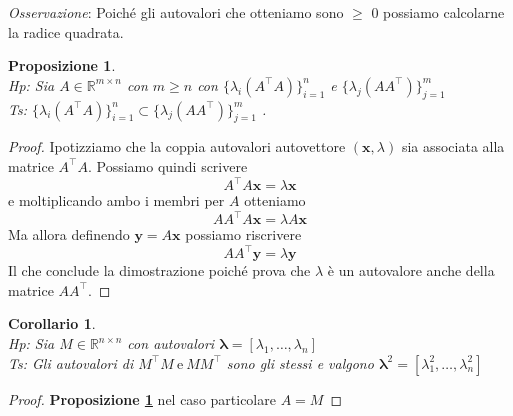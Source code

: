 \documentclass[11pt]{article}
\newtheorem{proposition}{Proposizione}
\newtheorem{corollary}{Corollario}
\newcommand{\R}{\mathbb{R}} %
\begin{document}
\noindent
\textit{Osservazione}: Poiché gli autovalori che otteniamo sono $\geq$ 0 possiamo calcolarne la radice quadrata.
\begin{proposition}\label{prop 2}
\textbf{}\\
\textit{Hp:} Sia $A \in \R^{m \times n}$ con $m \geq n$ con $\{\lambda_i(A^\top A)\}_{i=1}^{n}$ e $\{\lambda_j(A A^\top)\}_{j=1}^{m} $ \\
\textit{Ts:}  $ \{\lambda_i(A^\top A)\}_{i=1}^{n} \subset \{\lambda_j(A A^\top)\}_{j=1}^{m} $ .
\end{proposition}
\begin{proof}
Ipotizziamo che la coppia autovalori autovettore $(\mathbf{x},\lambda)$ sia associata alla matrice $A^\top      A$. Possiamo quindi scrivere $$A^\top      A\mathbf{x}=\lambda\mathbf{x}$$ e moltiplicando ambo i membri per $A$ otteniamo$$AA^\top      A\mathbf{x}=\lambda A\mathbf{x}$$
Ma allora definendo $\mathbf{y}=A\mathbf{x}$ possiamo riscrivere $$AA^\top      \mathbf{y}=\lambda \mathbf{y}$$
Il che conclude la dimostrazione poiché prova che  $\lambda$ è un autovalore anche della matrice $AA^\top      $. 
\end{proof}

\begin{corollary}\label{cor 1}
\textbf{}\\
\textit{Hp:} Sia $M \in \R^{n \times n}$ con autovalori $\mathbf{\lambda}=[\lambda_1, \dots, \lambda_n ]$\\
\textit{Ts:} Gli autovalori di $M^\top      M \ \text{e} \ MM^\top      $ sono gli stessi e valgono $\mathbf{\lambda}^2=[\lambda_1^2, \dots, \lambda_n^2 ]$
\end{corollary}
\begin{proof}
\textbf{Proposizione \ref{prop 2}} nel caso particolare $A=M$
\end{proof}
\end{document}
